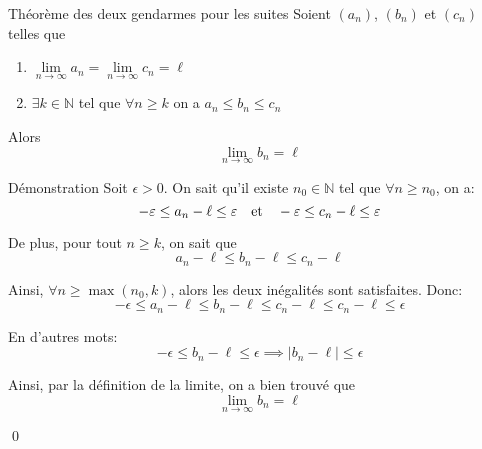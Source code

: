 \documentclass[a4paper]{article}
\begin{document}
\begin{parag}{Théorème des deux gendarmes pour les suites}
    Soient $\left(a_n\right)$, $\left(b_n\right)$ et $\left(c_n\right)$ telles que 
    \begin{enumerate}
        \item $\lim\limits_{n \to \infty} a_n = \lim\limits_{n \to \infty} c_n = \ell$
        \item $\exists k \in \mathbb{N}$ tel que $\forall n \geq k$ on a $a_n \leq b_n \leq c_n$
    \end{enumerate}

    Alors 
    \[\lim_{n \to \infty} b_n = \ell\]
    
    \begin{subparag}{Démonstration}
        Soit $\epsilon > 0$. On sait qu'il existe $n_0 \in \mathbb{N}$ tel que $\forall n \geq n_0$, on a: 
        \[-\varepsilon \leq a_n - \ell \leq \varepsilon \quad \text{et} \quad -\varepsilon \leq c_n - \ell \leq \varepsilon\]

        De plus, pour tout $n \geq k$, on sait que 
        \[a_n - \ell \leq b_n - \ell \leq c_n - \ell\]

        Ainsi, $\forall n \geq \max\left(n_0, k\right)$, alors les deux inégalités sont satisfaites. Donc: 
        \[-\epsilon \leq a_n - \ell \leq b_n - \ell \leq c_n - \ell \leq c_n - \ell \leq \epsilon\]

        En d'autres mots: 
        \[-\epsilon \leq b_n - \ell \leq \epsilon \implies \left|b_n - \ell\right| \leq \epsilon\]
        
        Ainsi, par la définition de la limite, on a bien trouvé que 
        \[\lim_{n \to \infty} b_n = \ell\]
        
        \qed
    \end{subparag}
\end{parag}
\end{document}
